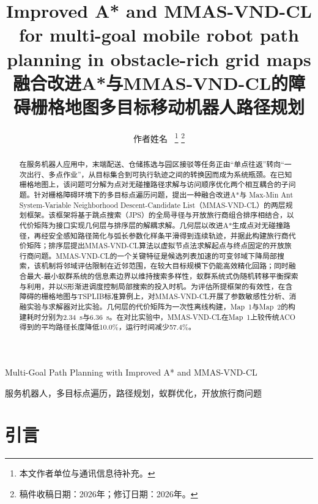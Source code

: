 \documentclass[lettersize,journal]{IEEEtran}
\begin{document}
\title{Improved A* and MMAS-VND-CL for multi-goal mobile robot path planning in obstacle-rich grid maps\\
{\normalsize 融合改进A*与MMAS-VND-CL的障碍栅格地图多目标移动机器人路径规划}}

\author{作者姓名~%
\thanks{本文作者单位与通讯信息待补充。}%
\thanks{稿件收稿日期：2026年；修订日期：2026年。}}

%
{Multi-Goal Path Planning with Improved A* and MMAS-VND-CL}

\maketitle

\begin{abstract}

在服务机器人应用中，末端配送、仓储拣选与园区接驳等任务正由“单点往返”转向“一次出行、多点作业”，从目标集合到可执行轨迹之间的转换因而成为系统瓶颈。在已知栅格地图上，该问题可分解为点对无碰撞路径求解与访问顺序优化两个相互耦合的子问题。针对栅格障碍环境下的多目标点遍历问题，提出一种融合改进A*与 Max-Min Ant System-Variable Neighborhood Descent-Candidate List（MMAS-VND-CL）的两层规划框架。该框架将基于跳点搜索（JPS）的全局寻径与开放旅行商组合排序相结合，以代价矩阵为接口实现几何层与排序层的解耦求解。几何层以改进A*生成点对无碰撞路径，再经安全感知路径简化与弧长参数化样条平滑得到连续轨迹，并据此构建旅行商代价矩阵；排序层提出MMAS-VND-CL算法以虚拟节点法求解起点与终点固定的开放旅行商问题。MMAS-VND-CL的一个关键特征是候选列表加速的可变邻域下降局部搜索，该机制将邻域评估限制在近邻范围，在较大目标规模下仍能高效精化回路；同时融合最大-最小蚁群系统的信息素边界以维持搜索多样性，蚁群系统式伪随机转移平衡探索与利用，并以S形渐进调度控制局部搜索的投入时机。为评估所提框架的有效性，在含障碍的栅格地图与TSPLIB标准算例上，对MMAS-VND-CL开展了参数敏感性分析、消融实验与求解器对比实验。几何层的代价矩阵为一次性离线构建，Map~1与Map~2的构建耗时分别为2.34~s与6.36~s。在对比实验中，MMAS-VND-CL在Map~1上较传统ACO得到的平均路径长度降低10.0\%，运行时间减少57.4\%。

\end{abstract}

\begin{IEEEkeywords}

服务机器人，多目标点遍历，路径规划，蚁群优化，开放旅行商问题

\end{IEEEkeywords}

\section{引言}
\end{document}

